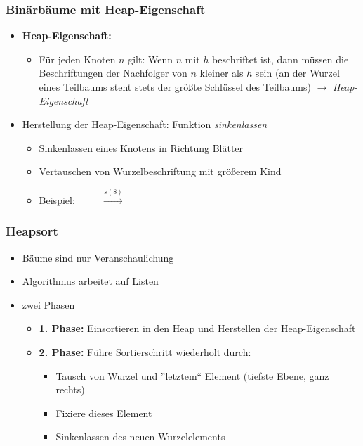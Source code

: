 \documentclass{beamer}
\begin{document}

\begin{frame} \frametitle{Binärbäume mit Heap-Eigenschaft}
	\small
	\begin{itemize}
		\item \textbf{Heap-Eigenschaft:}
		\begin{itemize}
			\item Für jeden Knoten $n$ gilt: Wenn $n$ mit $h$ beschriftet ist, dann müssen die Beschriftungen der Nachfolger von $n$ kleiner als $h$ sein (an der Wurzel eines Teilbaums steht stets der größte Schlüssel des Teilbaums) $\to$ \textit{Heap-Eigenschaft}
		\end{itemize}
		\item Herstellung der Heap-Eigenschaft: Funktion \textit{sinkenlassen}
		\begin{itemize}
			\item Sinkenlassen eines Knotens in Richtung Blätter
			\item Vertauschen von Wurzelbeschriftung mit größerem Kind
			\item Beispiel: $\qquad$ \fbox{\Tree [ .8 [ .9 ] [ .5 ] ]} $\overset{s(8)}{\longrightarrow}$ \fbox{\Tree [ .9 [ .8 ] [ .5 ]]}
		\end{itemize}
	\end{itemize}
\end{frame}

\begin{frame} \frametitle{Heapsort}
	\begin{itemize}
		\item Bäume sind nur Veranschaulichung
		\item Algorithmus arbeitet auf Listen
		\item zwei Phasen
		\begin{itemize}
			\item \textbf{1. Phase:} Einsortieren in den Heap und Herstellen der Heap-Eigenschaft
			\item \textbf{2. Phase:} Führe Sortierschritt wiederholt durch:
			\begin{itemize}
				\item Tausch von Wurzel und ''letztem`` Element (tiefste Ebene, ganz rechts)
				\item Fixiere dieses Element
				\item Sinkenlassen des neuen Wurzelelements
			\end{itemize}
		\end{itemize}
	\end{itemize}
\end{frame}
\end{document}
